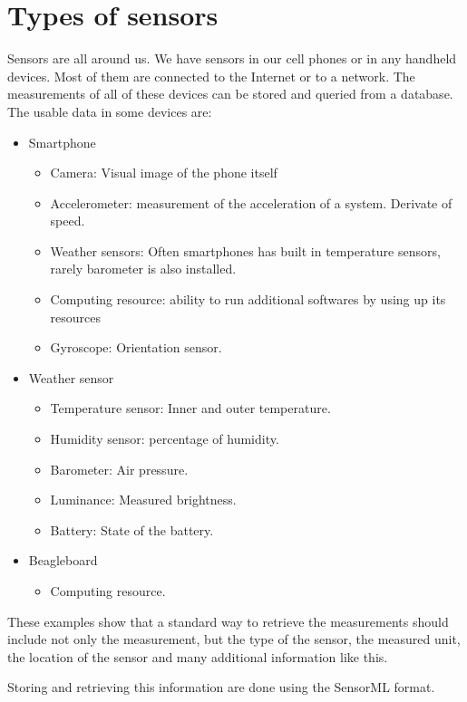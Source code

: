  \section{Types of sensors}
 
 Sensors are all around us. We have sensors in our cell phones or in any handheld devices. Most of them are connected to the Internet or to a network. The measurements of all of these devices can be stored and queried from a database. The usable data in some devices are:
 
 \begin{itemize}
 	\item Smartphone
 	 \begin{itemize}
	 	 \item Camera: Visual image of the phone itself
	 	 \item Accelerometer: measurement of the acceleration of a system. Derivate of speed.
	 	 \item Weather sensors: Often smartphones has built in temperature sensors, rarely barometer is also installed.
	 	 \item Computing resource: ability to run additional softwares by using up its resources
	 	 \item Gyroscope: Orientation sensor.
 	 \end{itemize}
 	 \item Weather sensor
 	 \begin{itemize}
 	 \item Temperature sensor: Inner and outer temperature.
 	 \item Humidity sensor: percentage of humidity.
 	 \item Barometer: Air pressure.
 	 \item Luminance: Measured brightness.
 	 \item Battery: State of the battery.
 	 \end{itemize}
 	 \item Beagleboard
 	 \begin{itemize}
	\item Computing resource.
 	 \end{itemize}
 \end{itemize}

These examples show that a standard way to retrieve the measurements should include not only the measurement, but the type of the sensor, the measured unit, the location of the sensor and many additional information like this. 

Storing and retrieving this information are done using the SensorML format.

